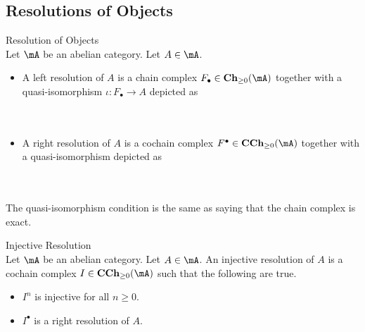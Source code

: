 \documentclass[a4paper]{article}
\begin{document}
\subsection{Resolutions of Objects}
\begin{defn}{Resolution of Objects}{}\\
Let $\mA$ be an abelian category. Let $A\in\mA$. 
\begin{itemize}
\item A left resolution of $A$ is a chain complex $F_\bullet\in\bold{Ch}_{\geq 0}(\mA)$ together with a quasi-isomorphism $\iota:F_\bullet\to A$ depicted as \\~\\
\\
\item A right resolution of $A$ is a cochain complex $F^\bullet\in\bold{CCh}_{\geq 0}(\mA)$ together with a quasi-isomorphism depicted as \\~\\
\\
\end{itemize}
\end{defn}

The quasi-isomorphism condition is the same as saying that the chain complex is exact. 

\begin{defn}{Injective Resolution}{}\\
Let $\mA$ be an abelian category. Let $A\in\mA$. An injective resolution of $A$ is a cochain complex $I\in\bold{CCh}_{\geq 0}(\mA)$ such that the following are true. 
\begin{itemize}
\item $I^n$ is injective for all $n\geq 0$. 
\item $I^\bullet$ is a right resolution of $A$. 
\end{itemize}
\end{defn}
\end{document}
